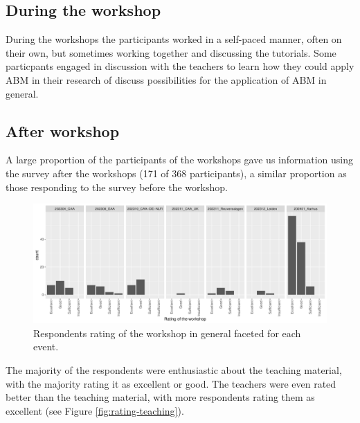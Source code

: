 \documentclass[
]{article}
\begin{document}
\hypertarget{during-the-workshop}{%
\subsection{During the workshop}\label{during-the-workshop}}

During the workshops the participants worked in a self-paced manner, often on their own, but sometimes working together and discussing the tutorials. Some particpants engaged in discussion with the teachers to learn how they could apply ABM in their research of discuss possibilities for the application of ABM in general.

\hypertarget{after-workshop}{%
\subsection{After workshop}\label{after-workshop}}

A large proportion of the participants of the workshops gave us information using the survey after the workshops (171 of 368 participants), a similar proportion as those responding to the survey before the workshop.

\begin{figure}
\centering
\includegraphics{paper_files/figure-latex/rating-workshop-1.pdf}
\caption{\label{fig:rating-workshop}Respondents rating of the workshop in general faceted for each event.}
\end{figure}

The majority of the respondents were enthusiastic about the teaching material, with the majority rating it as excellent or good. The teachers were even rated better than the teaching material, with more respondents rating them as excellent (see Figure \ref{fig:rating-teaching}).
\end{document}

